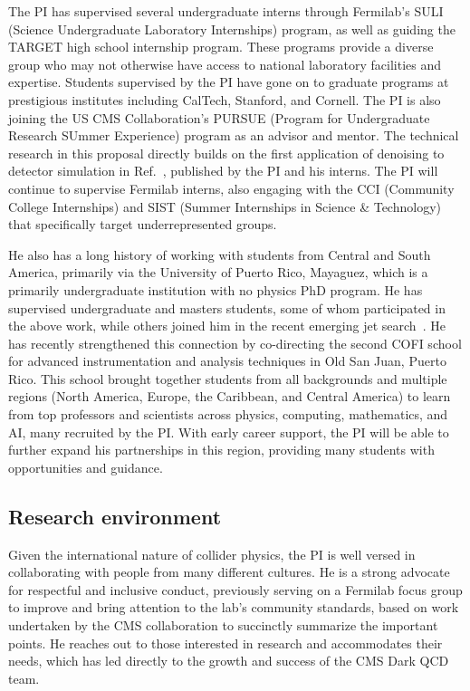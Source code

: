 The PI has supervised several undergraduate interns through Fermilab's SULI (Science Undergraduate Laboratory Internships) program,
as well as guiding the TARGET high school internship program.
These programs provide a diverse group who may not otherwise have access to national laboratory facilities and expertise.
Students supervised by the PI have gone on to graduate programs at prestigious institutes including CalTech, Stanford, and Cornell.
The PI is also joining the US CMS Collaboration's PURSUE (Program for Undergraduate Research SUmmer Experience) program as an advisor and mentor.
The technical research in this proposal directly builds on the first application of denoising to detector simulation in Ref.~\cite{Banerjee:2022gkg},
published by the PI and his interns.
The PI will continue to supervise Fermilab interns, also engaging with the CCI (Community College Internships) and SIST (Summer Internships in Science \& Technology)
that specifically target underrepresented groups.

He also has a long history of working with students from Central and South America,
primarily via the University of Puerto Rico, Mayaguez, which is a primarily undergraduate institution with no physics PhD program.
He has supervised undergraduate and masters students, some of whom participated in the above work,
while others joined him in the recent emerging jet search~\cite{CMS:2024gxp}.
He has recently strengthened this connection by co-directing
the second COFI school for advanced instrumentation and analysis techniques in Old San Juan, Puerto Rico.
This school brought together students from all backgrounds and multiple regions (North America, Europe, the Caribbean, and Central America)
to learn from top professors and scientists across physics, computing, mathematics, and AI, many recruited by the PI.
With early career support, the PI will be able to further expand his partnerships in this region,
providing many students with opportunities and guidance.

\subsection{Research environment}

Given the international nature of collider physics,
the PI is well versed in collaborating with people from many different cultures.
He is a strong advocate for respectful and inclusive conduct,
previously serving on a Fermilab focus group to improve and bring attention to the lab's community standards,
based on work undertaken by the CMS collaboration to succinctly summarize the important points.
He reaches out to those interested in research and accommodates their needs,
which has led directly to the growth and success of the CMS Dark QCD team.


